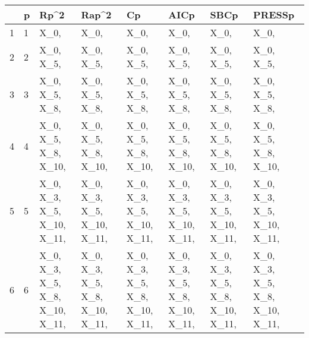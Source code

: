 \begin{tabular}{llllllll}
\toprule
{} &  p &                                              Rp\textasciicircum 2 &                                             Rap\textasciicircum 2 &                                                Cp &                                              AICp &                                              SBCp &                                            PRESSp \\
\midrule
1 &  1 &                                             X\_0,  &                                             X\_0,  &                                             X\_0,  &                                             X\_0,  &                                             X\_0,  &                                             X\_0,  \\
2 &  2 &                                        X\_0, X\_5,  &                                        X\_0, X\_5,  &                                        X\_0, X\_5,  &                                        X\_0, X\_5,  &                                        X\_0, X\_5,  &                                        X\_0, X\_5,  \\
3 &  3 &                                   X\_0, X\_5, X\_8,  &                                   X\_0, X\_5, X\_8,  &                                   X\_0, X\_5, X\_8,  &                                   X\_0, X\_5, X\_8,  &                                   X\_0, X\_5, X\_8,  &                                   X\_0, X\_5, X\_8,  \\
4 &  4 &                             X\_0, X\_5, X\_8, X\_10,  &                             X\_0, X\_5, X\_8, X\_10,  &                             X\_0, X\_5, X\_8, X\_10,  &                             X\_0, X\_5, X\_8, X\_10,  &                             X\_0, X\_5, X\_8, X\_10,  &                             X\_0, X\_5, X\_8, X\_10,  \\
5 &  5 &                       X\_0, X\_3, X\_5, X\_10, X\_11,  &                       X\_0, X\_3, X\_5, X\_10, X\_11,  &                       X\_0, X\_3, X\_5, X\_10, X\_11,  &                       X\_0, X\_3, X\_5, X\_10, X\_11,  &                       X\_0, X\_3, X\_5, X\_10, X\_11,  &                       X\_0, X\_3, X\_5, X\_10, X\_11,  \\
6 &  6 &                  X\_0, X\_3, X\_5, X\_8, X\_10, X\_11,  &                  X\_0, X\_3, X\_5, X\_8, X\_10, X\_11,  &                  X\_0, X\_3, X\_5, X\_8, X\_10, X\_11,  &                  X\_0, X\_3, X\_5, X\_8, X\_10, X\_11,  &                  X\_0, X\_3, X\_5, X\_8, X\_10, X\_11,  &                  X\_0, X\_3, X\_5, X\_8, X\_10, X\_11,  \\

\end{tabular}
